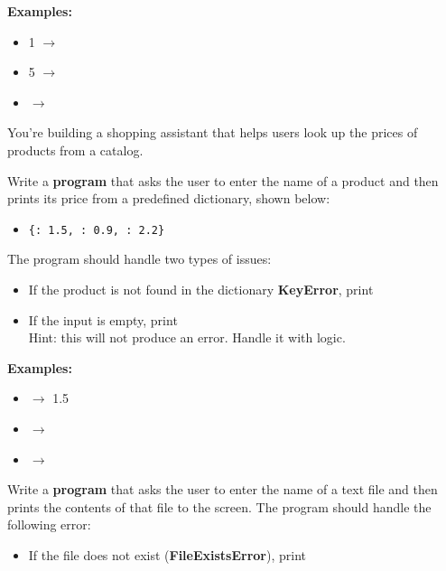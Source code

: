 		\textbf{Examples:}
		\begin{itemize}
			\item {} 1 $\rightarrow$ 
			\item {} 5 $\rightarrow$ 
			\item {}  $\rightarrow$ 
		\end{itemize}




	\item 
		You're building a shopping assistant that helps users look up the prices of products 
		from a catalog.

		Write a \textbf{program} that asks the user to enter the name of a product and then prints 
		its price from a predefined dictionary, shown below:
		\begin{itemize}
			\item \texttt{\{: 1.5, : 0.9, : 2.2\}}
		\end{itemize}
		The program should handle two types of issues:
		\begin{itemize}
			\item If the product is not found in the dictionary \textbf{KeyError}, 
				print 
			\item If the input is empty, print \\
				Hint: this will not produce an error. Handle it with logic.	
		\end{itemize}

		\textbf{Examples:}
		\begin{itemize}
			\item {}  $\rightarrow$ 1.5
			\item {}  $\rightarrow$ 
			\item {} \csq{} $\rightarrow$ 
		\end{itemize}



	\item 
		Write a \textbf{program} that asks the user to enter the name of a text file and then prints 
		the contents of that file to the screen. The program should handle the following error:
		\begin{itemize}
			\item If the file does not exist (\textbf{FileExistsError}), print 
		\end{itemize}

